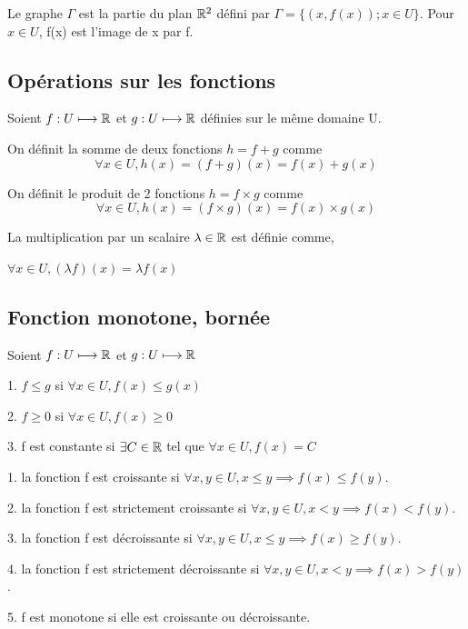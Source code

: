 \documentclass[a4paper, 12pt]{article}
\begin{document}
Le graphe $\Gamma$ est la partie du plan $\mathbb{R}^2$ défini par $\Gamma = \{(x, f(x)); x \in U\}$.
Pour $x \in U$, f(x) est l'image de x par f.

\subsection{Opérations sur les fonctions}

Soient $f: U \longmapsto \mathbb{R}$ et $g: U \longmapsto \mathbb{R}$ définies sur le même domaine U.

On définit la somme de deux fonctions $h = f + g$ comme
$$
\forall x \in U, h(x) = (f + g)(x) = f(x) + g(x)
$$

On définit le produit de 2 fonctions $h = f \times g$ comme
$$
\forall x \in U, h(x) = (f \times g)(x) = f(x) \times g(x)
$$

\begin{remark}
    La multiplication par un scalaire $\lambda \in \mathbb{R}$ est définie comme,\par $\forall x \in U, (\lambda f)(x) = \lambda f(x)$
\end{remark}

\subsection{Fonction monotone, bornée}

\begin{definition}
    Soient $f: U \longmapsto \mathbb{R}$ et $g: U \longmapsto \mathbb{R}$

    \item 1. $f \leq g$ si $\forall x \in U, f(x) \leq g(x)$
    \item 2. $f \geq 0$ si $\forall x \in U, f(x) \geq 0$
    \item 3. f est constante si $\exists C \in \mathbb{R}$ tel que $\forall x \in U, f(x) = C$
\end{definition}

\begin{definition}
    \item 1. la fonction f est croissante si $\forall x, y \in U, x \leq y \implies f(x) \leq f(y)$.
    \item 2. la fonction f est strictement croissante si $\forall x, y \in U, x \lt y \implies f(x) \lt f(y)$.
    \item 3. la fonction f est décroissante si $\forall x, y \in U, x \leq y \implies f(x) \geq f(y)$.
    \item 4. la fonction f est strictement décroissante si $\forall x, y \in U, x \lt y \implies f(x) \gt f(y)$.
    \item 5. f est monotone si elle est croissante ou décroissante.
\end{definition}
\end{document}
